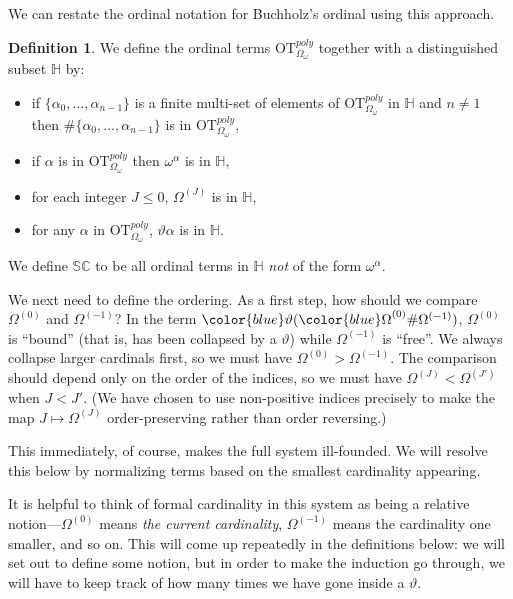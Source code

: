 \documentclass[11pt]{amsart}
\theoremstyle{definition}
\newtheorem{definition}[theorem]{Definition}
\begin{document}
We can restate the ordinal notation for Buchholz's ordinal using this approach.

\begin{definition}
  We define the ordinal terms $\mathrm{OT}^{poly}_{\Omega_\omega}$ together with a distinguished subset $\mathbb{H}$ by:
  \begin{itemize}
  \item if $\{\alpha_0,\ldots,\alpha_{n-1}\}$ is a finite multi-set of elements of $\mathrm{OT}^{poly}_{\Omega_\omega}$ in $\mathbb{H}$ and $n\neq 1$ then $\#\{\alpha_0,\ldots,\alpha_{n-1}\}$ is in $\mathrm{OT}^{poly}_{\Omega_\omega}$,
  \item if $\alpha$ is in $\mathrm{OT}^{poly}_{\Omega_\omega}$ then $\omega^\alpha$ is in $\mathbb{H}$,
  \item for each integer $J\leq 0$, $\Omega^{(J)}$ is in $\mathbb{H}$,
  \item for any $\alpha$ in $\mathrm{OT}^{poly}_{\Omega_\omega}$, $\vartheta\alpha$ is in $\mathbb{H}$.
  \end{itemize}

  We define $\mathbb{SC}$ to be all ordinal terms in $\mathbb{H}$ \emph{not} of the form $\omega^\alpha$.
\end{definition}

We next need to define the ordering. As a first step, how should we compare $\Omega^{(0)}$ and $\Omega^{(-1)}$? In the term ${\color{blue}\vartheta}({\color{blue}\Omega}^{(0)}\#\Omega^{(-1)})$, $\Omega^{(0)}$ is ``bound'' (that is, has been collapsed by a $\vartheta$) while $\Omega^{(-1)}$ is ``free''. We always collapse larger cardinals first, so we must have $\Omega^{(0)}>\Omega^{(-1)}$. The comparison should depend only on the order of the indices, so we must have $\Omega^{(J)}<\Omega^{(J')}$ when $J<J'$. (We have chosen to use non-positive indices precisely to make the map $J\mapsto\Omega^{(J)}$ order-preserving rather than order reversing.)

This immediately, of course, makes the full system ill-founded. We will resolve this below by normalizing terms based on the smallest cardinality appearing.

It is helpful to think of formal cardinality in this system as being a relative notion---$\Omega^{(0)}$ means \emph{the current cardinality}, $\Omega^{(-1)}$ means the cardinality one smaller, and so on. This will come up repeatedly in the definitions below: we will set out to define some notion, but in order to make the induction go through, we will have to keep track of how many times we have gone inside a $\vartheta$.
\end{document}
